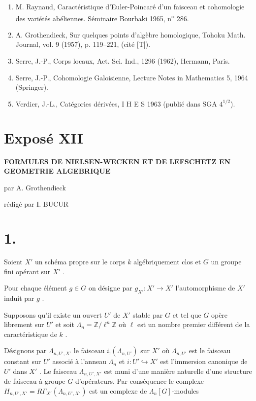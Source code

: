 \documentclass[11pt]{article}
\providecommand{\La}{\Lambda}
\providecommand{\bZ}{\mathbb Z}
\begin{document}
\begin{enumerate}
\item[{[1]}] M. Raynaud, Caractéristique d'Euler-Poincaré d'un faisceau et cohomologie des variétés abéliennes. Séminaire Bourbaki 1965, n\textsuperscript{o} 286.
\item[{[2]}] A. Grothendieck, Sur quelques points d'algèbre homologique, Tohoku Math. Journal, vol. 9 (1957), p. 119--221, (cité [T]).
\item[{[3]}] Serre, J.-P., Corps locaux, Act. Sci. Ind., 1296 (1962), Hermann, Paris.
\item[{[4]}] Serre, J.-P., Cohomologie Galoisienne, Lecture Notes in Mathematics 5, 1964 (Springer).
\item[{[5]}] Verdier, J.-L., Catégories dérivées, I H E S 1963 (publié dans SGA $4^{1/2}$).
\end{enumerate}

\section*{Exposé XII}

\begin{center}
\Large\bf FORMULES DE NIELSEN-WECKEN ET DE LEFSCHETZ EN GEOMETRIE ALGEBRIQUE
\end{center}

\begin{center}
par A. Grothendieck

rédigé par I. BUCUR
\end{center}

\bigskip

\section*{1.}
Soient $X'$ un schéma propre sur le corps $k$ algébriquement clos et $G$ un groupe fini opérant sur $X'$ .

Pour chaque élément $g \in G$ on désigne par $g_{X'} : X' \to X'$ l'automorphisme de $X'$ induit par $g$ .

Supposons qu'il existe un ouvert $U'$ de $X'$ stable par $G$ et tel que $G$ opère librement sur $U'$ et soit $\La_n = \bZ/\ell^n\bZ$ où $\ell$ est un nombre premier différent de la caractéristique de $k$ .

Désignons par $\La_{n,U',X'}$ le faisceau $i_!(\La_{n,U'})$ sur $X'$ où $\La_{n,U'}$ est le faisceau constant sur $U'$ associé à l'anneau $\La_n$ et $i : U' \hookrightarrow X'$ est l'immersion canonique de $U'$ dans $X'$ . Le faisceau $\La_{n,U',X'}$ est muni d'une manière naturelle d'une structure de faisceau à groupe $G$ d'opérateurs. Par conséquence le complexe $H_{n,U',X'} = R\Gamma_{X'}(\La_{n,U',X'})$ est un complexe de $\La_n[G]$-modules%
\end{document}
